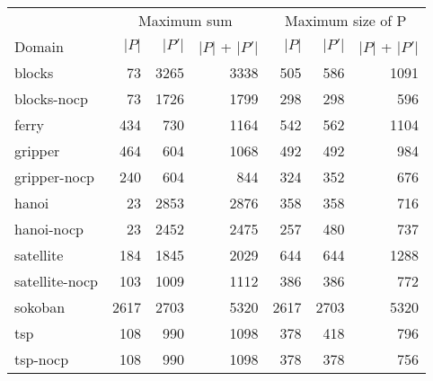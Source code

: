\begin{tabular}{l|rrr|rrr}
	\toprule
	& \multicolumn{3}{c|}{Maximum sum} & \multicolumn{3}{c}{Maximum size of P}\\
	Domain & $\vert P \vert$ & $\vert P' \vert$ & $\vert P \vert$ + $\vert P' \vert$ & $\vert P \vert$  & $\vert P' \vert$ & $\vert P \vert$ + $\vert P' \vert$ \\
	\midrule
	blocks & 73 & 3265 & 3338 & 505 & 586 & 1091 \\
	blocks-nocp & 73 & 1726 & 1799 & 298 & 298 & 596 \\
	ferry & 434 & 730 & 1164 & 542 & 562 & 1104 \\
	gripper & 464 & 604 & 1068 & 492 & 492 & 984 \\
	gripper-nocp & 240 & 604 & 844 & 324 & 352 & 676 \\
	hanoi & 23 & 2853 & 2876 & 358 & 358 & 716 \\
	hanoi-nocp & 23 & 2452 & 2475 & 257 & 480 & 737 \\
	satellite & 184 & 1845 & 2029 & 644 & 644 & 1288 \\
	satellite-nocp & 103 & 1009 & 1112 & 386 & 386 & 772 \\
	sokoban & 2617 & 2703 & 5320 & 2617 & 2703 & 5320 \\
	tsp & 108 & 990 & 1098 & 378 & 418 & 796 \\
	tsp-nocp & 108 & 990 & 1098 & 378 & 378 & 756 \\
	\bottomrule
\end{tabular}